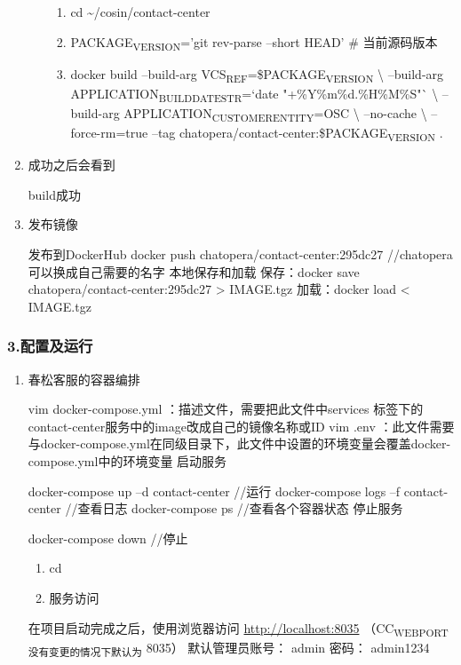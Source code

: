 \documentclass{article}
\begin{document}
\begin{enumerate}
\begin{enumerate}
    \begin{enumerate}
    \tightlist
    \item
      cd \textasciitilde{}/cosin/contact-center
    \item
      PACKAGE\textsubscript{VERSION}='git rev-parse --short HEAD' \#
      当前源码版本
    \item
      docker build --build-arg
      VCS\textsubscript{REF}=\$PACKAGE\textsubscript{VERSION}
      \textbackslash{} --build-arg
      APPLICATION\textsubscript{BUILDDATESTR}=`date
      "+\%Y\%m\%d.\%H\%M\%S"` \textbackslash{} --build-arg
      APPLICATION\textsubscript{CUSTOMERENTITY}=OSC \textbackslash{}
      --no-cache \textbackslash{} --force-rm=true --tag
      chatopera/contact-center:\$PACKAGE\textsubscript{VERSION} .
    \end{enumerate}
  \end{enumerate}
\item
  成功之后会看到

  build成功
\item
  发布镜像

  发布到DockerHub docker push chatopera/contact-center:295dc27
  //chatopera可以换成自己需要的名字 本地保存和加载 保存：docker save
  chatopera/contact-center:295dc27 \textgreater{} IMAGE.tgz 加载：docker
  load \textless{} IMAGE.tgz
\end{enumerate}

\hypertarget{ux914dux7f6eux53caux8fd0ux884c}{%
\subsubsection{3.配置及运行}\label{ux914dux7f6eux53caux8fd0ux884c}}

\begin{enumerate}
\item
  春松客服的容器编排

  vim docker-compose.yml ：描述文件，需要把此文件中services
  标签下的contact-center服务中的image改成自己的镜像名称或ID vim .env
  ：此文件需要与docker-compose.yml在同级目录下，此文件中设置的环境变量会覆盖docker-compose.yml中的环境变量
  启动服务

  docker-compose up --d contact-center //运行 docker-compose logs --f
  contact-center //查看日志 docker-compose ps //查看各个容器状态
  停止服务

  docker-compose down //停止

  \begin{enumerate}
  \tightlist
  \item
    cd
  \item
    服务访问
  \end{enumerate}

  在项目启动完成之后，使用浏览器访问 \url{http://localhost:8035}
  （CC\textsubscript{WEBPORT没有变更的情况下默认为} 8035）
  默认管理员账号： admin 密码： admin1234
\end{enumerate}
\end{document}
